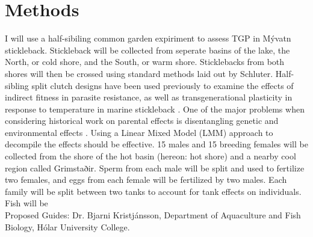 \documentclass[12pt]{extarticle}
\begin{document}


\section*{Methods}
I will use a half-sibiling common garden expiriment to assess TGP in M\'yvatn stickleback. Stickleback will be collected from seperate basins of the lake, the North, or cold shore, and the South, or warm shore. Sticklebacks from both shores will then be crossed using standard methods laid out by Schluter. Half-sibling split clutch designs have been used previously to examine the effects of indirect fitness in parasite resistance, as well as transgenerational plasticity in response to temperature in marine stickleback \citep{Barber2001,Ramler2014}. One of the major problems when considering historical work on parental effects is disentangling genetic and environmental effects \citep{Donelson2018}. Using a Linear Mixed Model (LMM) approach to decompile the effects should be effective.
15 males and 15 breeding females will be collected from the shore of the hot basin (hereon: hot shore) and a nearby cool region called Grimstaðir. Sperm from each male will be split and used to fertilize two females, and eggs from each female will be fertilized by two males. Each family will be split between two tanks to account for tank effects on individuals. Fish will be
\\

Proposed Guides: Dr. Bjarni Kristj\'ansson, Department of Aquaculture and Fish Biology, H\'olar University College.

\end{document}
